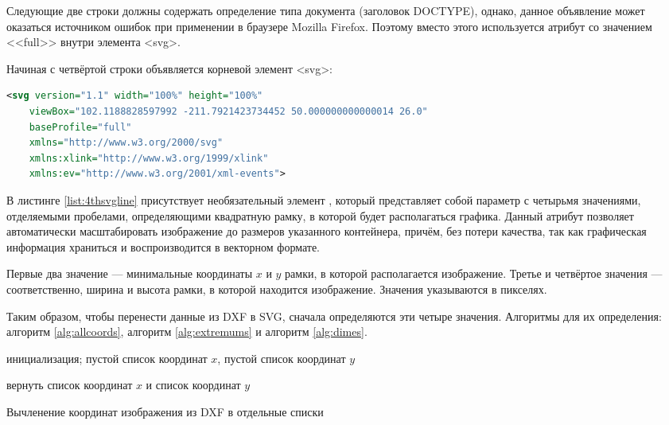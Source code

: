 Следующие две строки должны содержать определение типа документа (заголовок DOCTYPE), однако, данное объявление может оказаться источником ошибок при применении в браузере Mozilla Firefox. Поэтому вместо этого используется атрибут  со значением <<full>> внутри элемента <svg>.

Начиная с четвёртой строки объявляется корневой элемент <svg>:

\begin{lstlisting}[language=XML,caption={Первая строка SVG-файлов},label=list:4thsvgline]
	<svg version="1.1" width="100%" height="100%"
	viewBox="102.1188828597992 -211.7921423734452 50.000000000000014 26.0"
	baseProfile="full"
	xmlns="http://www.w3.org/2000/svg"
	xmlns:xlink="http://www.w3.org/1999/xlink"
	xmlns:ev="http://www.w3.org/2001/xml-events">
\end{lstlisting}

В листинге \ref{list:4thsvgline} присутствует необязательный элемент , который представляет собой параметр с четырьмя значениями, отделяемыми пробелами, определяющими квадратную рамку, в которой будет располагаться графика. Данный атрибут позволяет автоматически масштабировать изображение до размеров указанного контейнера, причём, без потери качества, так как графическая информация храниться и воспроизводится в векторном формате.

Первые два значение --- минимальные координаты $x$ и $y$ рамки, в которой располагается изображение. Третье и четвёртое значения --- соответственно, ширина и высота рамки, в которой находится изображение. Значения указываются в пикселях.

Таким образом, чтобы перенести данные из DXF в SVG, сначала определяются эти четыре значения. Алгоритмы для их определения: алгоритм \ref{alg:allcoords}, алгоритм \ref{alg:extremums} и алгоритм \ref{alg:dimes}.

\begin{algorithm}[H]
	\SetAlgoLined
	инициализация; пустой список координат $x$, пустой список координат $y$
	
	
	
	
	вернуть список координат $x$ и список координат $y$
	\caption{Вычленение координат изображения из DXF в отдельные списки}
	\label{alg:allcoords}
\end{algorithm}

